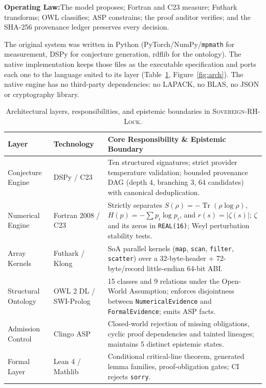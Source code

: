 \documentclass[11pt,letterpaper]{article}
\newcommand{\takeaway}[2]{%
  \vspace{6pt}\noindent\colorbox{primary!8}{%
    \parbox{\dimexpr\linewidth-2\fboxsep\relax}{%
      \vspace{3pt}\textbf{\color{primary}#1:}\hspace{0.5em}#2\vspace{3pt}%
    }%
  }\vspace{6pt}%
}
\newcommand{\code}[1]{\texttt{#1}}
\begin{document}
\takeaway{Operating Law}{The model proposes; Fortran and C23 measure; Futhark transforms; OWL classifies; ASP constrains; the proof auditor verifies; and the SHA-256 provenance ledger preserves every decision.}

The original system was written in Python (PyTorch/NumPy/\texttt{mpmath} for measurement, DSPy for conjecture generation, rdflib for the ontology). The native implementation keeps those files as the executable specification and ports each one to the language suited to its layer (Table~\ref{tab:layers}, Figure~\ref{fig:arch}). The native engine has no third-party dependencies: no LAPACK, no BLAS, no JSON or cryptography library.

\begin{table}[!htbp]
\centering
\caption{Architectural layers, responsibilities, and epistemic boundaries in \textsc{Sovereign-RH-Lock}.}
\label{tab:layers}
\begin{tabularx}{\linewidth}{llX}
\toprule
\textbf{Layer} & \textbf{Technology} & \textbf{Core Responsibility \& Epistemic Boundary} \\
\midrule
Conjecture Engine & DSPy / C23 & Ten structured signatures; strict provider temperature validation; bounded provenance DAG (depth 4, branching 3, 64 candidates) with canonical deduplication. \\
Numerical Engine & Fortran 2008 / C23 & Strictly separates $S(\rho) = -\operatorname{Tr}(\rho\log\rho)$, $H(p) = -\sum p_i\log p_i$, and $r(s) = |\zeta(s)|$; $\zeta$ and its zeros in \code{REAL(16)}; Weyl perturbation stability tests. \\
Array Kernels & Futhark / Klong & SoA parallel kernels (\texttt{map}, \texttt{scan}, \texttt{filter}, \texttt{scatter}) over a 32-byte-header + 72-byte/record little-endian 64-bit ABI. \\
Structural Ontology & OWL 2 DL / SWI-Prolog & 15 classes and 9 relations under the Open-World Assumption; enforces disjointness between \texttt{NumericalEvidence} and \texttt{FormalEvidence}; emits ASP facts. \\
Admission Control & Clingo ASP & Closed-world rejection of missing obligations, cyclic proof dependencies and tainted lineages; maintains 5 distinct epistemic states. \\
Formal Layer & Lean 4 / Mathlib & Conditional critical-line theorem, generated lemma families, proof-obligation gates; CI rejects \code{sorry}. \\
\bottomrule
\end{tabularx}
\end{table}
\end{document}
